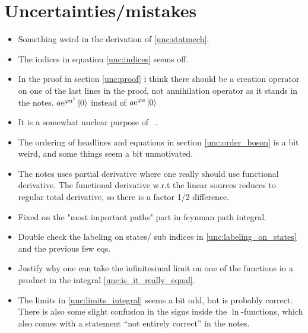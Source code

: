 \section{Uncertainties/mistakes}

\begin{itemize}
\item Something weird in the derivation of \eqref{unc:statmech}.
\item The indices in equation \eqref{unc:indices} seems off.  
\item In the proof in section \ref{unc:proof} i think there should be a creation operator on one of the last lines in the proof, not annihilation operator as it stands in the notes. $a\mathrm{e}^{\varphi a^\dagger}\ket{0}$ instead of $a\mathrm{e}^{\varphi a}\ket{0}$
\item It is a somewhat unclear purpose of ~. 
\item The ordering of headlines and equations in section \ref{unc:order_boson} is a bit weird, and some things seem a bit unmotivated. 
\item The notes uses partial derivative where one really should use functional derivative. The functional derivative w.r.t the linear sources reduces to regular total derivative, so there is a factor 1/2 difference. 
\item Fixed on the "most important paths" part in feynman path integral. 
\item Double check the labeling on states/ sub indices in \eqref{unc:labeling_on_states} and the previous few eqs. 
\item Justify why one can take the infinitesimal limit on one of the functions in a product in the integral \eqref{unc:is_it_really_equal}.
\item The limits in \eqref{unc:limits_integral} seems a bit odd, but is probably correct. There is also some slight confusion in the signs inside the \(\ln\)-functions, which also comes with a statement ``not entirely correct'' in the notes.

\end{itemize}